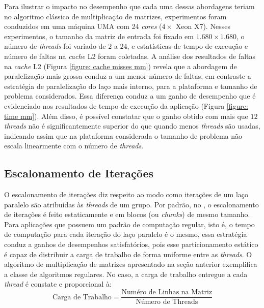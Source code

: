 \documentclass{SBCbookchapter}
\begin{document}
		Para ilustrar o impacto no desempenho que cada uma dessas
		abordagens teriam no algoritmo clássico de multiplicação de
		matrizes, experimentos foram conduzidos em uma máquina UMA com
		24 \textit{cores} ($4 \times$ Xeon X7). Nesses experimentos, o
		tamanho da matriz de entrada foi fixado em $1.680 \times 1.680$,
		o número de \textit{threads} foi variado de $2$ a $24$, e
		estatísticas de tempo de execução e número de faltas na
		\textit{cache} L2 foram coletadas.  A análise dos resultados de
		faltas na \textit{cache} L2 (Figura \ref{figure: cache misses
		mm}) revela que a abordagem de paralelização mais grossa conduz
		a um menor número de faltas, em contraste a estratégia de
		paralelização do laço mais interno, para a plataforma e tamanho
		de problema considerados. Essa diferença conduz a um ganho de
		desempenho que é evidenciado nos resultados de tempo de execução
		da aplicação (Figura \ref{figure: time mm}). Além disso, é
		possível constatar que o ganho obtido com mais que $12$
		\textit{threads} não é significantemente superior do que quando
		menos \textit{threads} são usadas, indicando assim que na
		plataforma considerada o tamanho de problema não escala
		linearmente com o número de \textit{threads}.

	\subsection{Escalonamento de Iterações}
	\label{subsection: escalonamento de iteracoes}

		O escalonamento de iterações diz respeito ao modo como iterações
		de um laço paralelo são atribuídas às \textit{threads} de um
		grupo. Por padrão, no \openmp, o escalonamento de iterações é
		feito estaticamente e em blocos (ou \textit{chunks}) de mesmo
		tamanho. Para aplicações que possuem um padrão de computação
		regular, isto é, o tempo de computação para cada iteração do
		laço paralelo é o mesmo, essa estratégia conduz a ganhos de
		desempenhos satisfatórios, pois esse particionamento estático é
		capaz de distribuir a carga de trabalho de forma uniforme entre
		as \textit{threads}. O algoritmo de multiplicação de matrizes
		apresentado na seção anterior exemplifica a classe de algoritmos
		regulares. No caso, a carga de trabalho entregue a cada
		\textit{thread} é constate e proporcional à:
		\begin{equation}
			\text{Carga de Trabalho} = \dfrac{\text{Numéro de Linhas na Matriz}}%
			                                 {\text{Número de Threads}}
		\end{equation}
\end{document}
